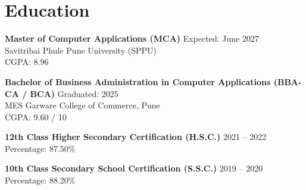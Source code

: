 \documentclass[a4paper,10pt]{article}
\begin{document}
\section*{Education}

\textbf{Master of Computer Applications (MCA)} \hfill Expected: June 2027\\
Savitribai Phule Pune University (SPPU)\\
CGPA: 8.96 

\vspace{4pt} 

\textbf{Bachelor of Business Administration in Computer Applications (BBA-CA / BCA)} \hfill Graduated: 2025\\
MES Garware College of Commerce, Pune\\
CGPA: 9.60 / 10

\vspace{4pt} 

\textbf{12th Class Higher Secondary Certification (H.S.C.)} \hfill 2021 -- 2022\\
Percentage: 87.50\%

\vspace{4pt} 

\textbf{10th Class Secondary School Certification (S.S.C.)} \hfill 2019 -- 2020\\
Percentage: 88.20\%
\end{document}
